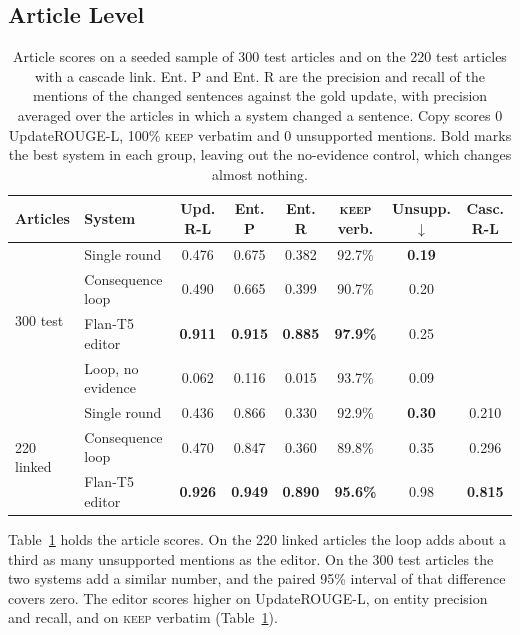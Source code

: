 \documentclass[11pt]{article}
\newcommand{\keep}{\textsc{keep}}
\begin{document}
\subsection{Article Level}
\label{sec:article}
\begin{table}[t]
\centering
\footnotesize
\setlength{\tabcolsep}{7pt}
\begin{tabular}{@{}llcccccc@{}}
\toprule
\textbf{Articles} & \textbf{System} & \textbf{Upd. R-L} & \textbf{Ent. P} & \textbf{Ent. R} & \keep{} \textbf{verb.} & \textbf{Unsupp.} $\downarrow$ & \textbf{Casc. R-L} \\
\midrule
\multirow{4}{*}{300 test} & Single round & 0.476 & 0.675 & 0.382 & 92.7\% & \textbf{0.19} & \\
 & Consequence loop & 0.490 & 0.665 & 0.399 & 90.7\% & 0.20 & \\
 & Flan-T5 editor & \textbf{0.911} & \textbf{0.915} & \textbf{0.885} & \textbf{97.9\%} & 0.25 & \\
 & Loop, no evidence & 0.062 & 0.116 & 0.015 & 93.7\% & 0.09 & \\
\midrule
\multirow{3}{*}{220 linked} & Single round & 0.436 & 0.866 & 0.330 & 92.9\% & \textbf{0.30} & 0.210 \\
 & Consequence loop & 0.470 & 0.847 & 0.360 & 89.8\% & 0.35 & 0.296 \\
 & Flan-T5 editor & \textbf{0.926} & \textbf{0.949} & \textbf{0.890} & \textbf{95.6\%} & 0.98 & \textbf{0.815} \\
\bottomrule
\end{tabular}
\caption{Article scores on a seeded sample of 300 test articles and on the 220 test articles with a cascade link. Ent. P and Ent. R are the precision and recall of the mentions of the changed sentences against the gold update, with precision averaged over the articles in which a system changed a sentence. Copy scores 0 UpdateROUGE-L, 100\% \keep{} verbatim and 0 unsupported mentions. Bold marks the best system in each group, leaving out the no-evidence control, which changes almost nothing.}
\label{tab:editor-article}
\end{table}

Table~\ref{tab:editor-article} holds the article scores. On the 220 linked articles the loop adds about a third as many unsupported mentions as the editor. On the 300 test articles the two systems add a similar number, and the paired 95\% interval of that difference covers zero. The editor scores higher on UpdateROUGE-L, on entity precision and recall, and on \keep{} verbatim (Table~\ref{tab:editor-article}).
\end{document}
